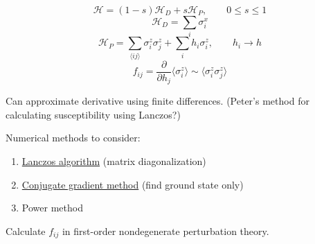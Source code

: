 \documentclass[a4paper]{article}
\newcommand{\ham}{\mathcal{H}}
\newcommand{\nn}[2]{\langle #1 #2 \rangle}
\newcommand{\av}[1]{\langle #1 \rangle}
\begin{document}
\begin{equation}
  \ham = (1 - s) \ham_D + s \ham_P,
  \qquad
  0 \leq s \leq 1
  \label{def-h_qaa}
\end{equation}
\begin{equation}
  \ham_D = \sum_i \sigma^x_i
  \label{def-h_d}
\end{equation}
\begin{equation}
  \ham_P = \sum_{\nn{i}{j}} \sigma^z_i \sigma^z_j + \sum_i h_i \sigma^z_i,
  \qquad
  h_i \rightarrow h
  \label{def-h_p}
\end{equation}
\begin{equation}
  f_{ij} = \frac{\partial}{\partial h_j} \av{\sigma^z_i}
  \sim \av{\sigma^z_i \sigma^z_j}
  \label{def-f}
\end{equation}

Can approximate derivative using finite differences. (Peter's method for
calculating susceptibility using Lanczos?)

Numerical methods to consider:
\begin{enumerate}
  \item \href{http://en.wikipedia.org/wiki/Lanczos_algorithm}
    {Lanczos algorithm} (matrix diagonalization)
  \item \href{http://en.wikipedia.org/wiki/Conjugate_gradient_method}
    {Conjugate gradient method} (find ground state only)
  \item Power method
\end{enumerate}

Calculate $f_{ij}$ in first-order nondegenerate perturbation theory.
\end{document}
